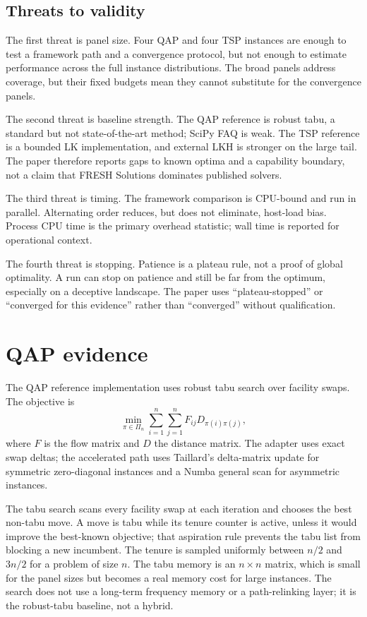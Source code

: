 \documentclass[pdflatex,sn-mathphys-num]{sn-jnl}
\begin{document}
\subsection{Threats to validity}

The first threat is panel size. Four QAP and four TSP instances are enough to test a framework path and
a convergence protocol, but not enough to estimate performance across the full instance
distributions. The broad panels address coverage, but their fixed budgets mean they cannot substitute
for the convergence panels.

The second threat is baseline strength. The QAP reference is robust tabu, a standard but not
state-of-the-art method; SciPy FAQ is weak. The TSP reference is a bounded LK implementation, and
external LKH is stronger on the large tail. The paper therefore reports gaps to known optima and a
capability boundary, not a claim that FRESH Solutions dominates published solvers.

The third threat is timing. The framework comparison is CPU-bound and run in parallel. Alternating
order reduces, but does not eliminate, host-load bias. Process CPU time is the primary overhead
statistic; wall time is reported for operational context.

The fourth threat is stopping. Patience is a plateau rule, not a proof of global optimality. A run can
stop on patience and still be far from the optimum, especially on a deceptive landscape. The paper
uses “plateau-stopped” or “converged for this evidence” rather than “converged” without qualification.

\section{QAP evidence}
\label{sec:qap}

The QAP reference implementation uses robust tabu search over facility swaps. The objective is
\begin{equation}
\min_{\pi\in\Pi_n}\sum_{i=1}^{n}\sum_{j=1}^{n} F_{ij}D_{\pi(i)\pi(j)},
\end{equation}
where $F$ is the flow matrix and $D$ the distance matrix. The adapter uses exact swap deltas; the
accelerated path uses Taillard's delta-matrix update for symmetric zero-diagonal instances and a
Numba general scan for asymmetric instances.

The tabu search scans every facility swap at each iteration and chooses the best non-tabu move. A
move is tabu while its tenure counter is active, unless it would improve the best-known objective;
that aspiration rule prevents the tabu list from blocking a new incumbent. The tenure is sampled
uniformly between $n/2$ and $3n/2$ for a problem of size $n$. The tabu memory is an $n\times n$
matrix, which is small for the panel sizes but becomes a real memory cost for large instances. The
search does not use a long-term frequency memory or a path-relinking layer; it is the robust-tabu
baseline, not a hybrid.
\end{document}
